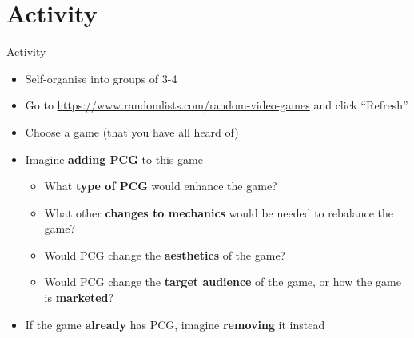 \part{Activity}
\frame{\partpage}

\begin{frame}{Activity}
	\begin{itemize}
		\item Self-organise into groups of 3-4
		\item Go to {\footnotesize\url{https://www.randomlists.com/random-video-games}} and click ``Refresh''
		\item Choose a game (that you have all heard of)
		\item Imagine \textbf{adding PCG} to this game
			\begin{itemize}
				\item What \textbf{type of PCG} would enhance the game?
				\item What other \textbf{changes to mechanics} would be needed to rebalance the game?
				\item Would PCG change the \textbf{aesthetics} of the game?
				\item Would PCG change the \textbf{target audience} of the game, or how the game is \textbf{marketed}?
			\end{itemize}
		\item If the game \textbf{already} has PCG, imagine \textbf{removing} it instead
	\end{itemize}
\end{frame}
